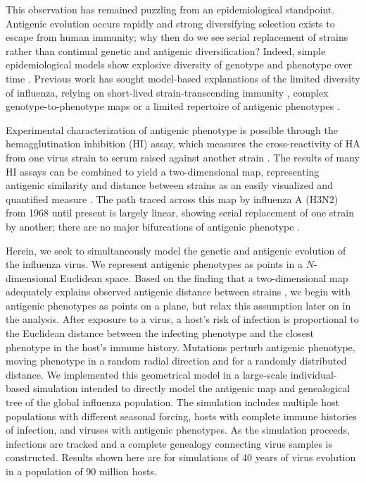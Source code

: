 \documentclass[11pt,oneside,letterpaper]{article}
\begin{document}
This observation has remained puzzling from an epidemiological standpoint.  Antigenic evolution occurs rapidly and strong diversifying selection exists to escape from human immunity; why then do we see serial replacement of strains rather than continual genetic and antigenic diversification?  Indeed, simple epidemiological models show explosive diversity of genotype and phenotype over time \cite{Ferguson03,Tria05}.  Previous work has sought model-based explanations of the limited diversity of influenza, relying on short-lived strain-transcending immunity \cite{Ferguson03,Tria05}, complex genotype-to-phenotype maps \cite{Koelle06} or a limited repertoire of antigenic phenotypes \cite{Recker07}. 

Experimental characterization of antigenic phenotype is possible through the hemagglutination inhibition (HI) assay, which measures the cross-reactivity of HA from one virus strain to serum raised against another strain \cite{Hirst43}.  The results of many HI assays can be combined to yield a two-dimensional map, representing antigenic similarity and distance between strains as an easily visualized and quantified measure \cite{Smith04}.  The path traced across this map by influenza A (H3N2) from 1968 until present is largely linear, showing serial replacement of one strain by another; there are no major bifurcations of antigenic phenotype \cite{Smith04}.

Herein, we seek to simultaneously model the genetic and antigenic evolution of the influenza virus.  We represent antigenic phenotypes as points in a $N$-dimensional Euclidean space.  Based on the finding that a two-dimensional map adequately explains observed antigenic distance between strains \cite{Smith04}, we begin with antigenic phenotypes as points on a plane, but relax this assumption later on in the analysis.  After exposure to a virus, a host's risk of infection is proportional to the Euclidean distance between the infecting phenotype and the closest phenotype in the host's immune history.  Mutations perturb antigenic phenotype, moving phenotype in a random radial direction and for a randomly distributed distance.  We implemented this geometrical model in a large-scale individual-based simulation intended to directly model the antigenic map and genealogical tree of the global influenza population.  The simulation includes multiple host populations with different seasonal forcing, hosts with complete immune histories of infection, and viruses with antigenic phenotypes.  As the simulation proceeds, infections are tracked and a complete genealogy connecting virus samples is constructed.  Results shown here are for simulations of 40 years of virus evolution in a population of 90 million hosts.
\end{document}
